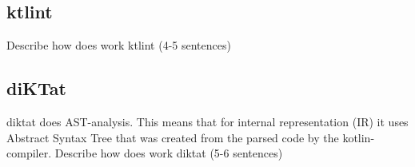 \subsection{ktlint}
\par
Describe how does work ktlint (4-5 sentences)

\subsection{diKTat}
\par
diktat does AST-analysis. This means that for internal representation (IR) it uses Abstract Syntax Tree that was created from the parsed code by the kotlin-compiler.
Describe how does work diktat (5-6 sentences)